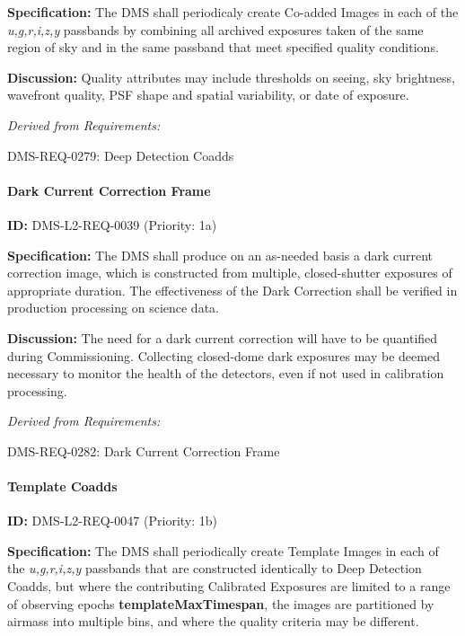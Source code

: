 \documentclass[SE,toc,lsstdraft]{lsstdoc}
\begin{document}
\textbf{Specification:} The DMS shall periodicaly create Co-added Images in each of the \textit{u,g,r,i,z,y} passbands by combining all archived exposures taken of the same region of sky and in the same passband that meet specified quality conditions.

\textbf{Discussion: }Quality attributes may include thresholds on seeing, sky brightness, wavefront quality, PSF shape and spatial variability, or date of exposure.

\emph{Derived from Requirements:}

DMS-REQ-0279:
Deep Detection Coadds \newline

\paragraph{Dark Current Correction Frame}\hfill  %

\label{DMS-L2-REQ-0039}
\textbf{ID:} DMS-L2-REQ-0039 (Priority: 1a)

\textbf{Specification:} The DMS shall produce on an as-needed basis a dark current correction image, which is constructed from multiple, closed-shutter exposures of appropriate duration. The effectiveness of the Dark Correction shall be verified in production processing on science data.

\textbf{Discussion: }The need for a dark current correction will have to be quantified during Commissioning. Collecting closed-dome dark exposures may be deemed necessary to monitor the health of the detectors, even if not used in calibration processing.

\emph{Derived from Requirements:}

DMS-REQ-0282:
Dark Current Correction Frame \newline

\paragraph{Template Coadds}\hfill  %

\label{DMS-L2-REQ-0047}
\textbf{ID:} DMS-L2-REQ-0047 (Priority: 1b)

\textbf{Specification:} The DMS shall periodically create Template Images in each of the \textit{u,g,r,i,z,y} passbands that are constructed identically to Deep Detection Coadds, but where the contributing Calibrated Exposures are limited to a range of observing epochs \textbf{templateMaxTimespan}, the images are partitioned by airmass into multiple bins, and where the quality criteria may be different.
\end{document}

